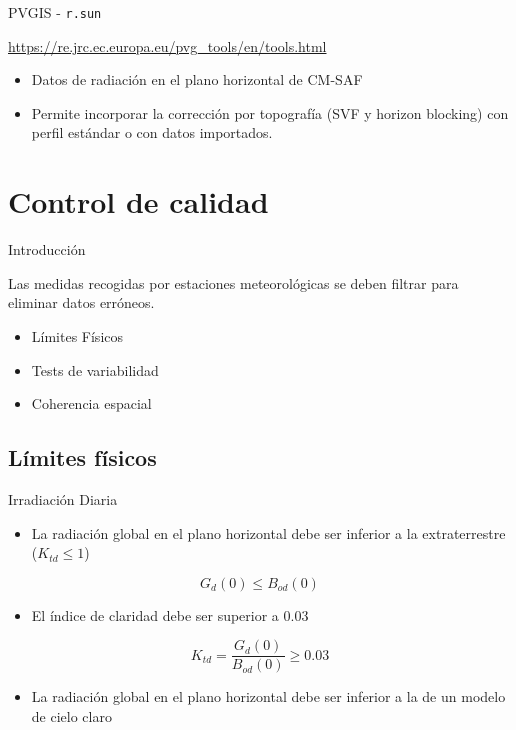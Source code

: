 \documentclass[aspectratio=169, usenames,svgnames,dvipsnames]{beamer}
\begin{document}
\begin{frame}[label={sec:org4e6327d},fragile]{PVGIS - \texttt{r.sun}}
 \begin{block}{\url{https://re.jrc.ec.europa.eu/pvg\_tools/en/tools.html}}
\begin{itemize}
\item Datos de radiación en el plano horizontal de CM-SAF
\item Permite incorporar la corrección por topografía (SVF y horizon blocking) con perfil estándar o con datos importados.
\end{itemize}
\end{block}
\end{frame}

\section{Control de calidad}
\label{sec:orgdfc4881}
\begin{frame}[label={sec:org0385a39}]{Introducción}
\begin{block}{Las medidas recogidas por estaciones meteorológicas se deben filtrar para eliminar datos erróneos.}
\begin{itemize}
\item Límites Físicos
\item Tests de variabilidad
\item Coherencia espacial
\end{itemize}
\end{block}
\end{frame}


\subsection{Límites físicos}
\label{sec:orge196355}
\begin{frame}[label={sec:orge6e7794}]{Irradiación Diaria}
\begin{itemize}
\item La radiación global en el plano horizontal debe ser inferior a la extraterrestre (\(K_{td} \leq 1\))
\end{itemize}
\[
G_d(0) \leq B_{od}(0)
\]

\begin{itemize}
\item El índice de claridad debe ser superior a 0.03
\end{itemize}
\[
K_{td} = \frac{G_d(0)}{B_{od}(0)} \geq 0.03
\]

\begin{itemize}
\item La radiación global en el plano horizontal debe ser inferior a la de un modelo de cielo claro
\end{itemize}

\nocite{Younes.Claywell.ea2005, Estevez.Gavilan.ea2011, Geiger.Diabate.ea2002}
\end{frame}
\end{document}

